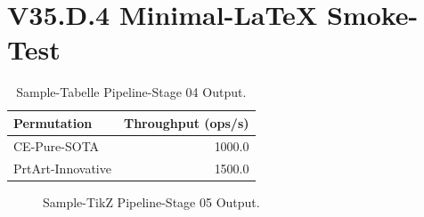 \documentclass[a4paper,12pt]{article}
\begin{document}
\section{V35.D.4 Minimal-LaTeX Smoke-Test}

\begin{table}[!htbp]
  \centering
  \begin{tabular}{lr}
    \toprule
    Permutation & Throughput (ops/s) \\
    \midrule
    CE-Pure-SOTA      & 1000.0 \\
    PrtArt-Innovative & 1500.0 \\
    \bottomrule
  \end{tabular}
  \caption{Sample-Tabelle Pipeline-Stage 04 Output.}
  \label{tab:v35d4_minimal}
\end{table}

\begin{figure}[!htbp]
  \centering
  \caption{Sample-TikZ Pipeline-Stage 05 Output.}
  \label{fig:v35d4_minimal}
\end{figure}
\end{document}
